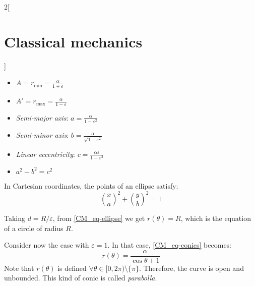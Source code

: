 \documentclass[../../../main.tex]{subfiles}
\begin{document}
\begin{multicols}{2}[\section{Classical mechanics}]
\begin{definition}
    \begin{itemize}
      \item $\displaystyle A=r_\text{min}=\frac{\alpha}{1+\varepsilon}$
      \item $\displaystyle A'=r_\text{max}=\frac{\alpha}{1-\varepsilon}$
      \item \emph{Semi-major axis}: $\displaystyle a=\frac{\alpha}{1-\varepsilon^2}$
      \item \emph{Semi-minor axis}: $\displaystyle b=\frac{\alpha}{\sqrt{1-\varepsilon^2}}$
      \item \emph{Linear eccentricity}: $\displaystyle c=\frac{\alpha\varepsilon}{1-\varepsilon^2}$
      \item $a^2-b^2=c^2$
    \end{itemize}
    In Cartesian coordinates, the points of an ellipse satisfy: $${\left(\frac{x}{a}\right)}^2+{\left(\frac{y}{b}\right)}^2=1$$
    \begin{center}
      \begin{minipage}{\linewidth}
        \centering
        
        \label{CM_ellipse}
      \end{minipage}
    \end{center}
  \end{definition}
  \begin{proposition}
    Taking $d=R/\varepsilon$, from \cref{CM_eq-ellipse} we get $\displaystyle r(\theta)=R$, which is the equation of a circle of radius $R$.
  \end{proposition}
  \begin{definition}[Parabolla: $\varepsilon=1$]
    Consider now the case with $\varepsilon=1$. In that case, \cref{CM_eq-conics} becomes: $$r(\theta)=\frac{\alpha}{\cos\theta+ 1}$$ Note that $r(\theta)$ is defined $\forall\theta\in[0,2\pi)\setminus\{\pi\}$. Therefore, the curve is open and unbounded. This kind of conic is called \emph{parabolla}.


\end{definition}
\end{multicols}
\end{document}
